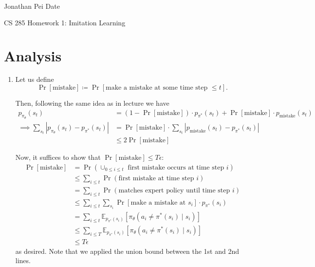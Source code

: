 \documentclass[12pt]{article}
\newcommand{\E}{\mathbb{E}}
\newcommand\abs[1]{\left| #1 \right|} %
\begin{document}
\noindent Jonathan Pei \hfill Date

\begin{center}
  {\large CS 285 Homework 1: Imitation Learning}
\end{center}

\section{Analysis}

\begin{enumerate}
    \item Let us define 
    \[\Pr[\mathrm{mistake}] \coloneqq \Pr[\text{make a mistake at some time step $\leq t$}].\]

    Then, following the same idea as in lecture we have 
    \begin{align*}
      p_{\pi_\theta}(s_t) &= (1 - \Pr[\mathrm{mistake}]) \cdot p_{\pi^*}(s_t) + \Pr[\mathrm{mistake}] \cdot p_{\mathrm{mistake}}(s_t) \\
      \implies \sum_{s_t} \abs{p_{\pi_\theta}(s_t) - p_{\pi^*}(s_t)} &= \Pr[\text{mistake}] \cdot \sum_{s_t} \abs{p_{\text{mistake}}(s_t) - p_{\pi^*}(s_t)} \\
      &\leq 2 \Pr[\text{mistake}]
    \end{align*}

    Now, it suffices to show that $\Pr[\text{mistake}] \leq T \epsilon$:
    \begin{align*}
      \Pr[\text{mistake}] &= \Pr\left(\cup_{0 \leq i \leq t} \text{ first mistake occurs at time step $i$}\right) \\
      &\leq \sum_{i \leq t}\Pr\left(\text{first mistake at time step $i$}\right) \\
      &= \sum_{i \leq t}\Pr\left(\text{matches expert policy until time step $i$}\right) \\
      &\leq \sum_{i \leq t} \sum_{s_i} \Pr[\text{make a mistake at $s_i$}] \cdot p_{\pi^*}(s_i) \\
      &= \sum_{i \leq t} \E_{p_{\pi^*}(s_i)}[\pi_\theta (a_i \neq \pi^*(s_i) \mid s_i)] \\
      &\leq \sum_{i \leq T} \E_{p_{\pi^*}(s_i)}[\pi_\theta (a_i \neq \pi^*(s_i) \mid s_i)] \\
      &\leq T \epsilon
    \end{align*}
    as desired. Note that we applied the union bound between the 1st and 2nd lines.


\end{enumerate}
\end{document}
